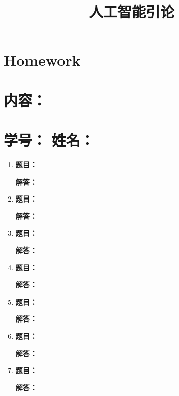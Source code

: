 \documentclass[12pt, a4paper]{ctexart} %
\title{人工智能引论} %
\author{} %
\date{} %
\begin{document}
\maketitle %

\vspace{-6.3em}

\section*{Homework } %
\section*{内容：}
\section*{学号： \quad 姓名：} %

\vspace{+3.5em}

\begin{enumerate} %

    \item \textbf{题目：}
    
    \textbf{解答：} 
    
    \item \textbf{题目：}
    
    \textbf{解答：} 

    \item \textbf{题目：}

    \textbf{解答：}

    \item \textbf{题目：}

    \textbf{解答：}

    \item \textbf{题目：}

    \textbf{解答：}

    \item \textbf{题目：}

    \textbf{解答：}

    \item \textbf{题目：}

    \textbf{解答：}
    
\end{enumerate}

\end{document}
